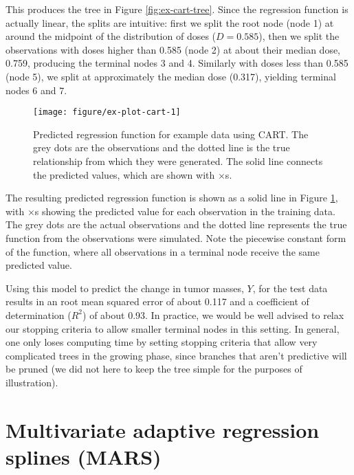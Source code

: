 \documentclass[12pt]{article}
\begin{document}
This produces the tree in Figure \ref{fig:ex-cart-tree}. Since the regression function is actually linear, the splits are intuitive: first we split the root node (node 1) at around the midpoint of the distribution of doses ($D = 0.585$), then we split the observations with doses higher than 0.585 (node 2) at about their median dose, 0.759, producing the terminal nodes 3 and 4. Similarly with doses less than 0.585 (node 5), we split at approximately the median dose (0.317), yielding terminal nodes 6 and 7.

\begin{figure}[!htbp]
\centering
  \texttt{[image: figure/ex-plot-cart-1]}

\caption[Predicted regression function for example data using CART]{Predicted regression function for example data using CART. The grey dots are the observations and the dotted line is the true relationship from which they were generated. The solid line connects the predicted values, which are shown with $\times$s.}\label{fig:ex-plot-cart}
\end{figure}

The resulting predicted regression function is shown as a solid line in Figure \ref{fig:ex-plot-cart}, with $\times$s showing the predicted value for each observation in the training data. The grey dots are the actual observations and the dotted line represents the true function from the observations were simulated. Note the piecewise constant form of the function, where all observations in a terminal node receive the same predicted value.

Using this model to predict the change in tumor masses, $Y$, for the test data results in an root mean squared error of about 0.117 and a coefficient of determination ($R^2$) of about 0.93. In practice, we would be well advised to relax our stopping criteria to allow smaller terminal nodes in this setting. In general, one only loses computing time by setting stopping criteria that allow very complicated trees in the growing phase, since branches that aren't predictive will be pruned (we did not here to keep the tree simple for the purposes of illustration).




\section{Multivariate adaptive regression splines (MARS)} %
\label{sec:mars}
\end{document}

